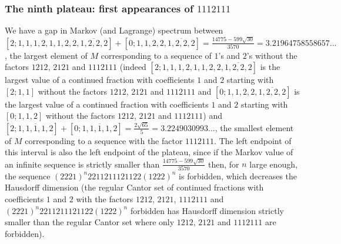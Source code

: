\documentclass[10pt]{amsart}
\numberwithin{equation}{section}
\theoremstyle{definition}
\begin{document}
\subsubsection{The ninth plateau: first appearances of $1112111$} We have a gap
in Markov (and Lagrange) spectrum between
$[2;1,1,1,2,1,1,2,2,\overline{1,2,2,2}]+[0;1,1,2,2,\overline{1,2,2,2}]=\frac{14775-599\sqrt{30}}{3570}=3.21964758558657...$,
the largest element of $M$ corresponding to a sequence of $1$'s and $2$'s
without the factors $1212$, $2121$ and $1112111$ (indeed
$[2;1,1,1,2,1,1,2,2,\overline{1,2,2,2}]$ is the largest value of a continued
fraction with coefficients $1$ and $2$ starting with $[2;1,1]$ without the
factors $1212$, $2121$ and $1112111$ and $[0;1,1,2,2,\overline{1,2,2,2}]$ is the
largest value of a continued fraction with coefficients $1$ and $2$ starting
with $[0;1,1,2]$ without the factors $1212$, $2121$ and $1112111$) and
$[2;\overline{1,1,1,1,2}]+[0;\overline{1,1,1,1,2}]=\frac{2\sqrt{65}}5=3.2249030993...$,
the smallest element of $M$ corresponding to a sequence with the factor
$1112111$. The left endpoint of this interval is also the left endpoint of the
plateau, since if the Markov value of an infinite sequence is strictly smaller
than $\frac{14775-599\sqrt{30}}{3570}$ then, for $n$ large enough, the sequence
$(2221)^n 2211211121122(1222)^n$ is forbidden, which decreases the Hausdorff
dimension (the regular Cantor set of continued fractions with coefficients $1$
and $2$ with the factors $1212$, $2121$, $1112111$ and $(2221)^n
2211211121122(1222)^n$ forbidden has Hausdorff dimension strictly smaller than
the regular Cantor set where only $1212$, $2121$ and $1112111$ are forbidden). 
\end{document}
